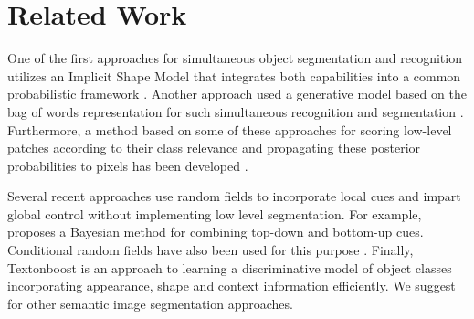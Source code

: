 \documentclass{article} %
\begin{document}

\section{Related Work}
\label{sec:Related}

One of the first approaches for simultaneous object segmentation and recognition utilizes an Implicit Shape Model that integrates both capabilities into a common probabilistic framework \cite{Leibe04combinedobject}. 
Another approach used a generative model based on the bag of words representation for such simultaneous recognition and segmentation \cite{cao:spatially}.  
Furthermore, a method based on some of these approaches for scoring low-level patches according to their class relevance and propagating these posterior probabilities to pixels has been developed \cite{conf/bmvc/CsurkaP08}.

Several recent approaches use random fields to incorporate local cues and impart global control without implementing low level segmentation. For example, \cite{Kumar:2005:OC:1068507.1068889} proposes a Bayesian method for combining top-down and bottom-up cues. Conditional random fields have also been used for this purpose \cite{Kumar:2005:HFF:1097115.1097790} \cite{Richard04multiscaleconditional}. Finally, Textonboost \cite{Shotton06textonboost:joint} is an approach to learning a discriminative model of object classes incorporating appearance, shape and context information efficiently. We suggest \cite{SegmentRegionsParts} for other semantic image segmentation approaches.
\end{document}
